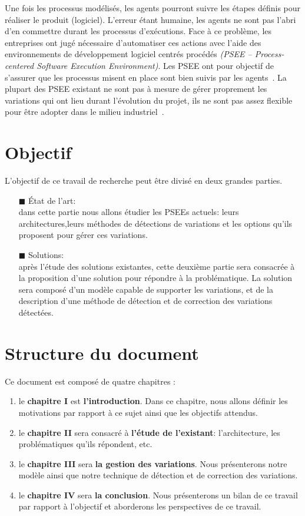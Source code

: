 Une fois les processus modélisés, les agents pourront suivre les étapes définis pour réaliser le produit (logiciel). L'erreur étant humaine, les agents ne sont pas l'abri d'en commettre durant les processus d'exécutions. Face à ce problème, les entreprises ont jugé nécessaire d'automatiser ces actions avec l'aide des environnements de développement logiciel centrés procédés \textit{(PSEE – Process-centered Software Execution Environment)}. Les PSEE ont pour objectif de s'assurer que les processus misent en place sont bien suivis par les agents~\cite{alm1}. La plupart des PSEE existant ne sont pas à mesure de gérer proprement les variations qui ont lieu durant l'évolution du projet, ils ne sont pas assez flexible pour être adopter dans le milieu industriel~\cite{kabaaj20}.\\ 


\section{Objectif}
L'objectif de ce travail de recherche peut être divisé en deux grandes parties. \\
\begin{itemize}
\item[\tiny{$\blacksquare$}] État de l'art: \\
dans cette partie nous allons étudier les PSEEs actuels: leurs architectures,leurs méthodes de détections de variations et les options qu'ils proposent pour gérer ces variations. \\
\item[\tiny{$\blacksquare$}] Solutions: \\
après l'étude des solutions existantes, cette deuxième partie sera consacrée à la proposition d'une solution pour répondre à la problématique. La solution sera composé d'un modèle capable de supporter les variations, et de la description d'une méthode de détection et de correction des variations détectées.
\end{itemize}


\section{Structure du document}
Ce document est composé de quatre chapitres :
\begin{enumerate}
\item le \textbf{chapitre I} est \textbf{l'introduction}. Dans ce chapitre, nous allons définir les motivations  par rapport à ce sujet ainsi que les objectifs attendus. 
\item le \textbf{chapitre II} sera consacré à \textbf{l'étude de l'existant}: l'architecture, les problématiques qu'ils répondent, etc.
\item le \textbf{chapitre III} sera \textbf{la gestion des variations}. Nous présenterons notre modèle ainsi que notre technique de détection et de correction des variations.
\item le \textbf{chapitre IV} sera \textbf{la conclusion}. Nous présenterons un bilan de ce travail par rapport à l'objectif et aborderons les perspectives de ce travail.
\end{enumerate}


